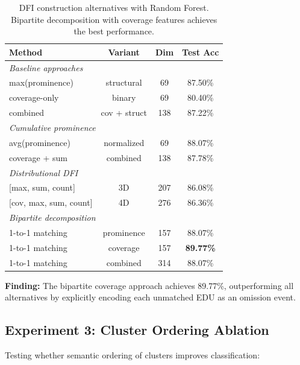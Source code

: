 \documentclass[11pt]{article}
\begin{document}
\begin{table}[h]
\centering
\small
\begin{tabular}{lccc}
\toprule
\textbf{Method} & \textbf{Variant} & \textbf{Dim} & \textbf{Test Acc} \\
\midrule
\multicolumn{4}{l}{\textit{Baseline approaches}} \\
max(prominence) & structural & 69 & 87.50\% \\
coverage-only & binary & 69 & 80.40\% \\
combined & cov + struct & 138 & 87.22\% \\
\midrule
\multicolumn{4}{l}{\textit{Cumulative prominence}} \\
avg(prominence) & normalized & 69 & 88.07\% \\
coverage + sum & combined & 138 & 87.78\% \\
\midrule
\multicolumn{4}{l}{\textit{Distributional DFI}} \\
{[}max, sum, count{]} & 3D & 207 & 86.08\% \\
{[}cov, max, sum, count{]} & 4D & 276 & 86.36\% \\
\midrule
\multicolumn{4}{l}{\textit{Bipartite decomposition}} \\
1-to-1 matching & prominence & 157 & 88.07\% \\
1-to-1 matching & coverage & 157 & \textbf{89.77\%} \\
1-to-1 matching & combined & 314 & 88.07\% \\
\bottomrule
\end{tabular}
\caption{DFI construction alternatives with Random Forest. Bipartite decomposition with coverage features achieves the best performance.}
\label{tab:dfi-alternatives}
\end{table}

\textbf{Finding:} The bipartite coverage approach achieves 89.77\%, outperforming all alternatives by explicitly encoding each unmatched EDU as an omission event.

\subsection{Experiment 3: Cluster Ordering Ablation}
\label{sec:ordering-ablation}

Testing whether semantic ordering of clusters improves classification:
\end{document}
